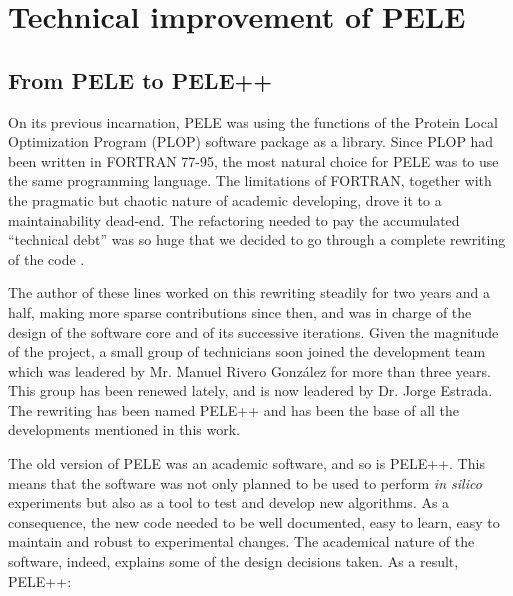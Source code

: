 \section{Technical improvement of PELE}

\subsection{From PELE to PELE++}

On its previous incarnation, PELE was using the functions of the Protein Local Optimization Program (PLOP)
\cite{jacobson_role_2002} software package as a library. Since PLOP had been written in FORTRAN
77-95, the most natural choice for PELE was to use the same programming language. The limitations of FORTRAN, together
with the pragmatic but chaotic nature of academic developing, drove it to a maintainability dead-end. The refactoring
needed to pay the accumulated ``technical debt'' was so huge that we decided to go through a complete rewriting of the code . 

The author of these lines worked on this rewriting steadily for two years and a half, making more sparse contributions since then, and was in charge of the design of the software core and of its successive iterations. Given the magnitude of the
project, a small group of technicians soon joined the development team which was leadered by Mr. Manuel Rivero Gonz\'alez
for more than three years. This group has been renewed lately, and is now leadered by Dr. Jorge Estrada. The rewriting
has been named PELE++ and has been the base of all the developments mentioned in this work.

The old version of PELE  was an academic software, and so is PELE++. This means that the software was not only planned to be used to
perform \textit{in silico} experiments but also as a tool to test and develop new algorithms. As a consequence, the new code
needed to be well documented, easy to learn, easy to maintain and robust to experimental changes. The academical nature
of the software, indeed, explains some of the design decisions taken. As a result, PELE++:

